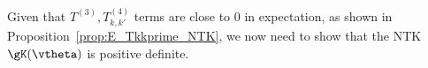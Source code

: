 Given that $T^{(3)}, T^{(4)}_{k,k'}$ terms are close to 0 in expectation, as shown in Proposition~\ref{prop:E_Tkkprime_NTK}, we now need to show that the NTK $\gK(\vtheta)$ is positive definite. 

